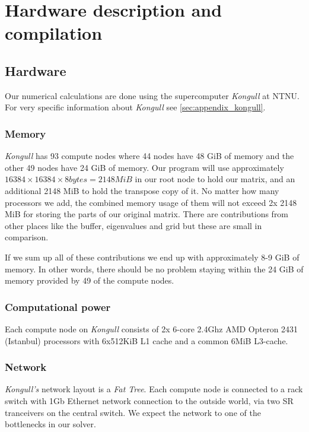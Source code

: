 \section{Hardware description and compilation} %
\label{sec:hardware_and_compilation}

\subsection{Hardware} %
\label{sub:hardware}
Our numerical calculations are done using the supercomputer \emph{Kongull} at NTNU. For very specific information about \emph{Kongull} see \ref{sec:appendix_kongull}.

\subsubsection{Memory} %
\label{ssub:memory}
\emph{Kongull} has 93 compute nodes where 44 nodes have 48 GiB of memory and the other 49 nodes have 24 GiB of memory. Our program will use approximately $16384 \times 16384 \times 8 bytes = 2148 MiB$ in our root node to hold our matrix, and an additional 2148 MiB to hold the transpose copy of it. No matter how many processors we add, the combined memory usage of them will not exceed 2x 2148 MiB for storing the parts of our original matrix. There are contributions from other places like the buffer, eigenvalues and grid but these are small in comparison.

If we sum up all of these contributions we end up with approximately 8-9 GiB of memory. In other words, there should be no problem staying within the 24 GiB of memory provided by 49 of the compute nodes.

\subsubsection{Computational power} %
\label{ssub:subsubsection_name}
Each compute node on \emph{Kongull} consists of 2x 6-core 2.4Ghz AMD Opteron 2431 (Istanbul) processors with 6x512KiB L1 cache and a common 6MiB L3-cache.

\subsubsection{Network} %
\label{ssub:network}
\emph{Kongull's} network layout is a \emph{Fat Tree}. Each compute node is connected to a rack switch with 1Gb Ethernet network connection to the outside world, via two SR tranceivers on the central switch. We expect the network to one of the bottlenecks in our solver.

